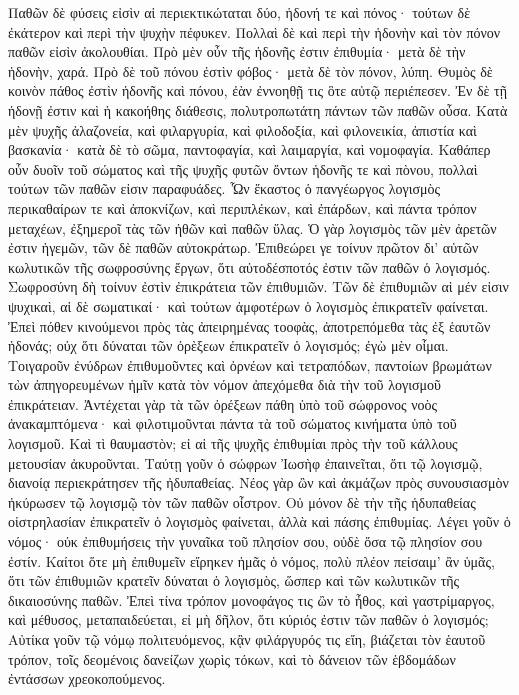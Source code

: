 Παθῶν δὲ φύσεις εἰσὶν αἱ περιεκτικώταται δύο, ἡδονή τε καὶ πόνος· τούτων δὲ ἐκάτερον καὶ περὶ τὴν ψυχὴν πέφυκεν. 
Πολλαὶ δὲ καὶ περὶ τὴν ἡδονὴν καὶ τὸν πόνον παθῶν εἰσὶν ἀκολουθίαι. 
Πρὸ μὲν οὖν τῆς ἡδονῆς ἐστιν ἐπιθυμία· μετὰ δὲ τὴν ἡδονὴν, χαρά. 
Πρὸ δὲ τοῦ πόνου ἐστὶν φόβος· μετὰ δὲ τὸν πόνον, λύπη. 
Θυμὸς δὲ κοινὸν πάθος ἐστὶν ἡδονῆς καὶ πόνου, ἐὰν ἐννοηθῇ τις ὃτε αὐτῷ περιέπεσεν. 
Ἐν δὲ τῇ ἡδονῇ ἐστιν καὶ ἡ κακοήθης διάθεσις, πολυτροπωτάτη πάντων τῶν παθῶν οὖσα. 
Κατὰ μὲν ψυχῆς ἀλαζονεία, καὶ φιλαργυρία, καὶ φιλοδοξία, καὶ φιλονεικία, ἀπιστία καὶ βασκανία· 
κατὰ δὲ τὸ σῶμα, παντοφαγία, καὶ λαιμαργία, καὶ νομοφαγία. 
Καθάπερ οὖν δυοῖν τοῦ σώματος καὶ τῆς ψυχῆς φυτῶν ὄντων ἡδονῆς τε καὶ πὸνου, πολλαὶ τούτων τῶν παθῶν εἰσιν παραφυάδες. 
Ὧν ἕκαστος ὁ πανγέωργος λογισμὸς περικαθαίρων τε καὶ ἀποκνίζων, καὶ περιπλέκων, καὶ ἐπάρδων, καὶ πάντα τρόπον μεταχέων, ἐξημεροῖ τὰς τῶν ἠθῶν καὶ παθῶν ὕλας. 
Ὁ γὰρ λογισμὸς τῶν μὲν ἀρετῶν ἐστιν ἡγεμῶν, τῶν δὲ παθῶν αὐτοκράτωρ. Ἐπιθεώρει γε τοίνυν πρῶτον δι' αὐτῶν κωλυτικῶν τῆς σωφροσύνης ἔργων, ὅτι αὐτοδέσποτός ἐστιν τῶν παθῶν ὁ λογισμός. 
Σωφροσύνη δὴ τοίνυν ἐστὶν ἐπικράτεια τῶν ἐπιθυμιῶν. 
Τῶν δὲ ἐπιθυμιῶν αἱ μέν εἰσιν ψυχικαὶ, αἱ δὲ σωματικαί· καὶ τούτων ἀμφοτέρων ὁ λογισμὸς ἐπικρατεῖν φαίνεται. 
Ἐπεὶ πόθεν κινούμενοι πρὸς τὰς ἀπειρημένας τοοφὰς, ἀποτρεπόμεθα τὰς ἐξ ἑαυτῶν ἡδονάς; οὐχ ὅτι δύναται τῶν ὀρὲξεων ἐπικρατεῖν ὁ λογισμός; ἐγὼ μὲν οἶμαι. 
Τοιγαροῦν ἐνύδρων ἐπιθυμοῦντες καὶ ὀρνέων καὶ τετραπόδων, παντοίων βρωμάτων τὼν ἀπηγορευμένων ἡμῖν κατὰ τὸν νόμον ἀπεχόμεθα διὰ τὴν τοῦ λογισμοῦ ἐπικράτειαν. 
Ἀντέχεται γὰρ τὰ τῶν ὀρέξεων πάθη ὑπὸ τοῦ σώφρονος νοὸς ἀνακαμπτόμενα· καὶ φιλοτιμοῦνται πάντα τὰ τοῦ σώματος κινήματα ὑπὸ τοῦ λογισμοῦ. 
Καὶ τὶ θαυμαστὸν; εἰ αἱ τῆς ψυχῆς ἐπιθυμίαι πρὸς τὴν τοῦ κάλλους μετουσίαν ἀκυροῦνται. 
Ταύτῃ γοῦν ὁ σώφρων Ἰωσὴφ ἐπαινεῖται, ὅτι τῷ λογισμῷ, διανοίᾳ περιεκράτησεν τῆς ἠδυπαθείας. 
Νέος γὰρ ὢν καὶ ἀκμάζων πρὸς συνουσιασμὸν ἠκύρωσεν τῷ λογισμῷ τὸν τῶν παθῶν οἶστρον. 
Οὐ μόνον δὲ τὴν τῆς ἡδυπαθείας οἰστρηλασίαν ἐπικρατεῖν ὁ λογισμὸς φαίνεται, ἀλλὰ καὶ πάσης ἐπιθυμίας. 
Λέγει γοῦν ὁ νόμος· οὐκ ἐπιθυμήσεις τὴν γυναῖκα τοῦ πλησίον σου, οὐδὲ ὅσα τῷ πλησίον σου ἐστίν. 
Καίτοι ὅτε μὴ ἐπιθυμεῖν εἴρηκεν ἡμᾶς ὁ νόμος, πολὺ πλέον πείσαιμ' ἂν ὑμᾶς, ὅτι τῶν ἐπιθυμιῶν κρατεῖν δύναται ὁ λογισμὸς, ὥσπερ καὶ τῶν κωλυτικῶν τῆς δικαιοσύνης παθῶν. 
Ἐπεὶ τίνα τρόπον μονοφάγος τις ὢν τὸ ἦθος, καὶ γαστρίμαργος, καὶ μέθυσος, μεταπαιδεύεται, εἰ μὴ δῆλον, ὅτι κύριός ἐστιν τῶν παθῶν ὁ λογισμός; 
Αὐτίκα γοῦν τῷ νόμῳ πολιτευόμενος, κᾂν φιλάργυρός τις εἴη, βιάζεται τὸν ἑαυτοῦ τρόπον, τοῖς δεομένοις δανείζων χωρὶς τόκων, καὶ τὸ δάνειον τῶν ἑβδομάδων ἐντάσσων χρεοκοπούμενος. 
